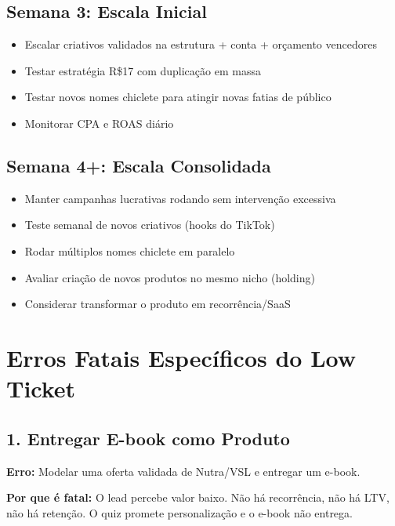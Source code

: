 \documentclass[12pt, a4paper]{article}
\begin{document}
\subsection{Semana 3: Escala Inicial}

\begin{itemize}[label=$\square$]
    \item Escalar criativos validados na estrutura + conta + orçamento vencedores
    \item Testar estratégia R\$17 com duplicação em massa
    \item Testar novos nomes chiclete para atingir novas fatias de público
    \item Monitorar CPA e ROAS diário
\end{itemize}

\subsection{Semana 4+: Escala Consolidada}

\begin{itemize}[label=$\square$]
    \item Manter campanhas lucrativas rodando sem intervenção excessiva
    \item Teste semanal de novos criativos (hooks do TikTok)
    \item Rodar múltiplos nomes chiclete em paralelo
    \item Avaliar criação de novos produtos no mesmo nicho (holding)
    \item Considerar transformar o produto em recorrência/SaaS
\end{itemize}

\pagebreak

\section{Erros Fatais Específicos do Low Ticket}

\subsection{1. Entregar E-book como Produto}

\textbf{Erro:} Modelar uma oferta validada de Nutra/VSL e entregar um e-book.

\textbf{Por que é fatal:} O lead percebe valor baixo. Não há recorrência, não há LTV, não há retenção. O quiz promete personalização e o e-book não entrega.
\end{document}
